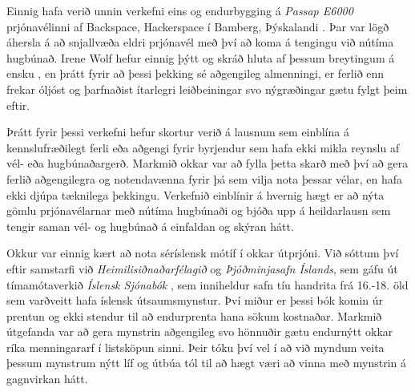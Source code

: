 \documentclass[a4paper,12pt,twoside]{article}
\begin{document}
Einnig hafa verið unnin verkefni eins og endurbygging á \textit{Passap E6000} prjónavélinni af Backspace, Hackerspace í Bamberg, Þýskalandi \cite{bamberg}. Þar var lögð áhersla á að snjallvæða eldri prjónavél með því að koma á tengingu við nútíma hugbúnað. Irene Wolf hefur einnig þýtt og skráð hluta af þessum breytingum á ensku  \cite{irene}, en þrátt fyrir að þessi þekking sé aðgengileg almenningi, er ferlið enn frekar óljóst og þarfnaðist ítarlegri leiðbeiningar svo nýgræðingar gætu fylgt þeim eftir.

Þrátt fyrir þessi verkefni hefur skortur verið á lausnum sem einblína á kennslufræðilegt ferli eða aðgengi fyrir byrjendur sem hafa ekki mikla reynslu af vél- eða hugbúnaðargerð. Markmið okkar var að fylla þetta skarð með því að gera ferlið aðgengilegra og notendavænna fyrir þá sem vilja nota þessar vélar, en hafa ekki djúpa tæknilega þekkingu. Verkefnið einblínir á hvernig hægt er að nýta gömlu prjónavélarnar með nútíma hugbúnaði og bjóða upp á heildarlausn sem tengir saman vél- og hugbúnað á einfaldan og skýran hátt.


Okkur var einnig kært að nota séríslensk mótíf í okkar útprjóni. Við sóttum því eftir samstarfi við \emph{Heimilisiðnaðarfélagið} og \emph{Þjóðminjasafn Íslands}, sem gáfu út tímamótaverkið \emph{Íslensk Sjónabók} \cite{Sjonabok}, sem inniheldur safn tíu handrita frá 16.-18. öld sem varðveitt hafa íslensk útsaumsmynstur. Því miður er þessi bók komin úr prentun og ekki stendur til að endurprenta hana sökum kostnaðar. Markmið útgefanda var að gera mynstrin aðgengileg svo hönnuðir gætu endurnýtt okkar ríka menningararf í listsköpun sinni. Þeir tóku því vel í að við myndum veita þessum mynstrum nýtt líf og útbúa tól til að hægt væri að vinna með mynstrin á gagnvirkan hátt.
\end{document}
